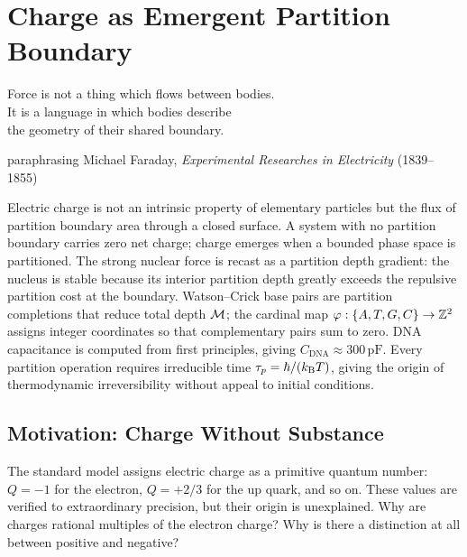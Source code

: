 
\chapter{Charge as Emergent Partition Boundary}
\label{chap:charge_emergence}

\epigraph{%
  Force is not a thing which flows between bodies.\\
  It is a language in which bodies describe\\
  the geometry of their shared boundary.%
}{paraphrasing Michael Faraday, \textit{Experimental Researches in Electricity} (1839--1855)}

\begin{chapterbox}
Electric charge is not an intrinsic property of elementary particles but the
flux of partition boundary area through a closed surface. A system with no
partition boundary carries zero net charge; charge emerges when a bounded
phase space is partitioned. The strong nuclear force is recast as a partition
depth gradient: the nucleus is stable because its interior partition depth
greatly exceeds the repulsive partition cost at the boundary. Watson--Crick
base pairs are partition completions that reduce total depth $\mathcal{M}$;
the cardinal map $\varphi: \{A, T, G, C\} \to \mathbb{Z}^2$ assigns integer
coordinates so that complementary pairs sum to zero. DNA capacitance is
computed from first principles, giving $C_{\mathrm{DNA}} \approx 300\,\mathrm{pF}$.
Every partition operation requires irreducible time $\tau_p = \hbar / (k_{\mathrm{B}} T)$,
giving the origin of thermodynamic irreversibility without appeal to initial
conditions.
\end{chapterbox}

\section{Motivation: Charge Without Substance}
\label{sec:charge_motivation}

The standard model assigns electric charge as a primitive quantum number:
$Q = -1$ for the electron, $Q = +2/3$ for the up quark, and so on. These
values are verified to extraordinary precision, but their origin is unexplained.
Why are charges rational multiples of the electron charge? Why is there a
distinction at all between positive and negative?

